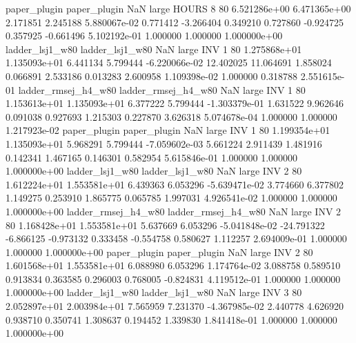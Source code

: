        paper_plugin        paper_plugin                   NaN      large    HOURS                 8 80 6.521286e+00   6.471365e+00      2.171851       2.245188  5.880067e-02      0.771412     -3.266404     0.349210       0.727860 -0.924725   0.357925    -0.661496   5.102192e-01            1.000000        1.000000        1.000000e+00
    ladder_lsj1_w80     ladder_lsj1_w80                   NaN      large      INV                 1 80 1.275868e+01   1.135093e+01      6.441134       5.799444 -6.220066e-02     12.402025     11.064691     1.858024       0.066891  2.533186   0.013283     2.600958   1.109398e-02            1.000000        0.318788        2.551615e-01
ladder_rmsej_h4_w80 ladder_rmsej_h4_w80                   NaN      large      INV                 1 80 1.153613e+01   1.135093e+01      6.377222       5.799444 -1.303379e-01      1.631522      9.962646     0.091038       0.927693  1.215303   0.227870     3.626318   5.074678e-04            1.000000        1.000000        1.217923e-02
       paper_plugin        paper_plugin                   NaN      large      INV                 1 80 1.199354e+01   1.135093e+01      5.968291       5.799444 -7.059602e-03      5.661224      2.911439     1.481916       0.142341  1.467165   0.146301     0.582954   5.615846e-01            1.000000        1.000000        1.000000e+00
    ladder_lsj1_w80     ladder_lsj1_w80                   NaN      large      INV                 2 80 1.612224e+01   1.553581e+01      6.439363       6.053296 -5.639471e-02      3.774660      6.377802     1.149275       0.253910  1.865775   0.065785     1.997031   4.926541e-02            1.000000        1.000000        1.000000e+00
ladder_rmsej_h4_w80 ladder_rmsej_h4_w80                   NaN      large      INV                 2 80 1.168428e+01   1.553581e+01      5.637669       6.053296 -5.041848e-02    -24.791322     -6.866125    -0.973132       0.333458 -0.554758   0.580627     1.112257   2.694009e-01            1.000000        1.000000        1.000000e+00
       paper_plugin        paper_plugin                   NaN      large      INV                 2 80 1.601568e+01   1.553581e+01      6.088980       6.053296  1.174764e-02      3.088758      0.589510     0.913834       0.363585  0.296003   0.768005    -0.824831   4.119512e-01            1.000000        1.000000        1.000000e+00
    ladder_lsj1_w80     ladder_lsj1_w80                   NaN      large      INV                 3 80 2.052897e+01   2.003984e+01      7.565959       7.231370 -4.367985e-02      2.440778      4.626920     0.938710       0.350741  1.308637   0.194452     1.339830   1.841418e-01            1.000000        1.000000        1.000000e+00
